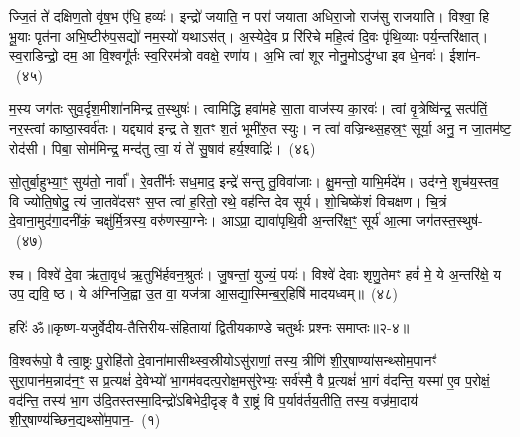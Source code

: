 ज्जि॒तं ते॑ दक्षिण॒तो वृ॑ष॒भ ए॑धि॒ हव्यः॑। इन्द्रो॑ जयाति॒ न परा॑ जयाता अधिरा॒जो राज॑सु राजयाति। विश्वा॒ हि भू॒याः पृत॑ना अभि॒ष्टीरु॑प॒सद्यो॑ नम॒स्यो॑ यथा\-ऽ\-स॑त्। अ॒स्येदे॒व प्र रि॑रिचे महि॒त्वं दि॒वः पृ॑थि॒व्याः पर्य॒न्तरि॑क्षात्। स्व॒राडिन्द्रो॒ दम॒ आ वि॒श्वगू᳚र्तः स्व॒रिरम॑त्रो ववक्षे॒ रणा॑य। अ॒भि त्वा॑ शूर नोनु॒मो\-ऽदु॑ग्धा इव धे॒नवः॑। ईशा॑न-~(४५)\ip

म॒स्य जग॑तः सुव॒र्दृश॒मीशा॑नमिन्द्र त॒स्थुषः॑। त्वामिद्धि हवा॑महे सा॒ता वाज॑स्य का॒रवः॑। त्वां वृ॒त्रेष्वि॑न्द्र॒ सत्प॑तिं॒ नर॒स्त्वां काष्ठा॒स्वर्व॑तः। यद्द्याव॑ इन्द्र ते श॒तꣳ श॒तं भूमी॑रु॒त स्युः। न त्वा॑ वज्रिन्थ्स॒हस्र॒ꣳ॒ सूर्या॒ अनु॒ न जा॒तम॑ष्ट॒ रोद॑सी। पिबा॒ सोम॑मिन्द्र॒ मन्द॑तु त्वा॒ यं ते॑ सु॒षाव॑ हर्य॒श्वाद्रिः॑।~(४६)\ip

सो॒तुर्बा॒हुभ्या॒ꣳ॒ सुय॑तो॒ नार्वा᳚। रे॒वती᳚र्नः सध॒माद॒ इन्द्रे॑ सन्तु तु॒विवा॑जाः। क्षु॒मन्तो॒ याभि॒र्मदे॑म। उद॑ग्ने॒ शुच॑य॒स्तव॒ वि ज्योति॒षोदु॒ त्यं जा॒तवे॑दसꣳ स॒प्त त्वा॑ ह॒रितो॒ रथे॒ वह॑न्ति देव सूर्य। शो॒चिष्के॑शं विचक्षण। चि॒त्रं दे॒वाना॒मुद॑गा॒दनी॑कं॒ चक्षु॑र्मि॒त्रस्य॒ वरु॑णस्या॒ग्नेः। आ\-ऽप्रा॒ द्यावा॑\-पृथि॒वी अ॒न्तरि॑क्ष॒ꣳ॒ सूर्य॑ आ॒त्मा जग॑तस्त॒स्थुष॑-~(४७)\ip

श्च। विश्वे॑ दे॒वा ऋ॑ता॒वृध॑ ऋ॒तुभि॑र्\mbox{}हवन॒श्रुतः॑। जु॒षन्तां॒ युज्यं॒ पयः॑। विश्वे॑ देवाः शृणु॒तेमꣳ हवं॑ मे॒ ये अ॒न्तरि॑क्षे॒ य उप॒ द्यवि॒ ष्ठ। ये अ॑ग्निजि॒ह्वा उ॒त वा॒ यज॑त्रा आ॒सद्या॒स्मिन्ब॒र्॒\mbox{}हिषि॑ मादयध्वम्॥~(४८)\ip

{\anuvakamend[{तदीशा॑न॒मद्रि॑स्त॒स्थुष॑स्त्रि॒ꣳ॒शच्च॑}]}%

{हरिः॑ ॐ}{॥कृष्ण-यजुर्वेदीय-तैत्तिरीय-संहितायां द्वितीयकाण्डे चतुर्थः प्रश्नः समाप्तः॥२-४॥}



\setcounter{anuvakam}{0}
वि॒श्वरू॑पो॒ वै त्वा॒ष्ट्रः पु॒रोहि॑तो दे॒वाना॑मासीथ्स्व॒स्रीयो\-ऽसु॑राणां॒ तस्य॒ त्रीणि॑ शी॒र्॒\mbox{}षाण्या॑सन्थ्सोम॒पानꣳ॑ सुरा॒पान॑म॒न्नाद॑न॒ꣳ॒ स प्र॒त्यक्षं॑ दे॒वेभ्यो॑ भा॒गम॑वदत्प॒रोक्ष॒मसु॑रेभ्यः॒ सर्व॑स्मै॒ वै प्र॒त्यक्षं॑ भा॒गं व॑दन्ति॒ यस्मा॑ ए॒व प॒रोक्षं॒ वद॑न्ति॒ तस्य॑ भा॒ग उ॑दि॒तस्तस्मा॒दिन्द्रो॑\-ऽबिभेदी॒दृङ् वै रा॒ष्ट्रं वि प॒र्याव॑र्तय॒तीति॒ तस्य॒ वज्र॑मा॒दाय॑ शी॒र्॒\mbox{}षाण्य॑च्छिन॒द्यथ्सो॑म॒पान॒-~(१)\ip


